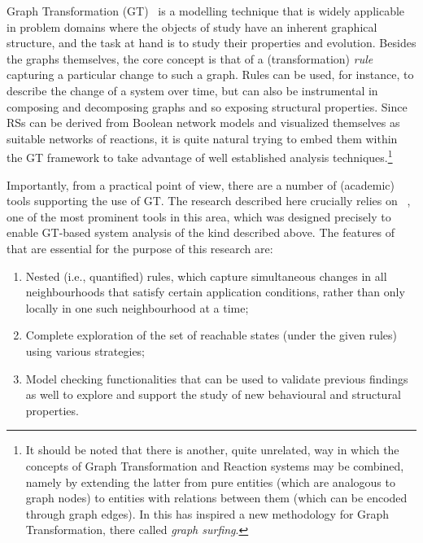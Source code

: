 Graph Transformation (GT)~\cite{DBLP:series/eatcs/EhrigEPT06,DBLP:books/sp/HeckelT20} is a modelling technique that is widely applicable in problem domains where the objects of study have an inherent graphical structure, and the task at hand is to study their properties and evolution. Besides the graphs themselves, the core concept is that of a (transformation) \emph{rule} capturing a particular change to such a graph. Rules can be used, for instance, to describe the change of a system over time, but can also be instrumental in composing and decomposing graphs and so exposing structural properties.
Since RSs can be derived from Boolean network models and visualized themselves as suitable networks of reactions, it is quite natural trying to embed them within the GT framework to take advantage of well established analysis techniques.\footnote{It should be noted that there is another, quite unrelated, way in which the concepts of Graph Transformation and Reaction systems may be combined, namely by extending the latter from pure entities (which are analogous to graph nodes) to entities with relations between them (which can be encoded through graph edges). In \cite{DBLP:journals/jlap/KreowskiR19} this has inspired a new methodology for Graph Transformation, there called \emph{graph surfing}.}

Importantly, from a practical point of view, there are a number of (academic) tools supporting the use of GT. The research described here crucially relies on \href{https://groove.cs.utwente.nl}{\GROOVE}~\cite{DBLP:journals/sttt/GhamarianMRZZ12}, one of the most prominent tools in this area, which was designed precisely to enable GT-based system analysis of the kind described above. The features of \GROOVE that are essential for the purpose of this research are:
\begin{enumerate}%
\item Nested (i.e., quantified) rules, which capture simultaneous changes in all neighbourhoods that satisfy certain application conditions, rather than only locally in one such neighbourhood at a time; 
\item Complete exploration of the set of reachable states (under the given rules) using various strategies;
\item Model checking functionalities that can be used to validate previous findings as well to explore and support the study of new behavioural and structural properties.
\end{enumerate}

